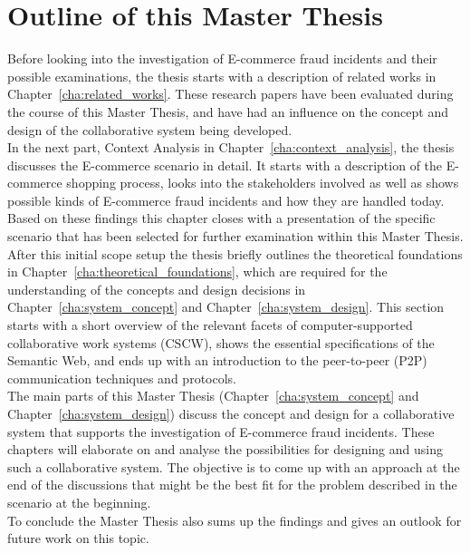 
\section{Outline of this Master Thesis}
\label{sec:thesis_outline}

Before looking into the investigation of \gls{E-commerce} fraud incidents and their possible examinations, the thesis starts with a description of related works in Chapter~\ref{cha:related_works}. These research papers have been evaluated during the course of this Master Thesis, and have had an influence on the concept and design of the collaborative system being developed. \\

In the next part, Context Analysis in Chapter~\ref{cha:context_analysis}, the thesis discusses the \gls{E-commerce} scenario in detail. It starts with a description of the \gls{E-commerce} shopping process, looks into the stakeholders involved as well as shows possible kinds of \gls{E-commerce} fraud incidents and how they are handled today. Based on these findings this chapter closes with a presentation of the specific scenario that has been selected for further examination within this Master Thesis. \\

After this initial scope setup the thesis briefly outlines the theoretical foundations in Chapter~\ref{cha:theoretical_foundations}, which are required for the understanding of the concepts and design decisions in Chapter~\ref{cha:system_concept} and Chapter~\ref{cha:system_design}. This section starts with a short overview of the relevant facets of computer-supported collaborative work systems (\gls{CSCW}), shows the essential specifications of the Semantic Web, and ends up with an introduction to the peer-to-peer (\gls{P2P}) communication techniques and protocols. \\

The main parts of this Master Thesis (Chapter~\ref{cha:system_concept} and Chapter~\ref{cha:system_design}) discuss the concept and design for a collaborative system that supports the investigation of \gls{E-commerce} fraud incidents. These chapters will elaborate on and analyse the possibilities for designing and using such a collaborative system. The objective is to come up with an approach at the end of the discussions that might be the best fit for the problem described in the scenario at the beginning. \\

To conclude the Master Thesis also sums up the findings and gives an outlook for future work on this topic.

